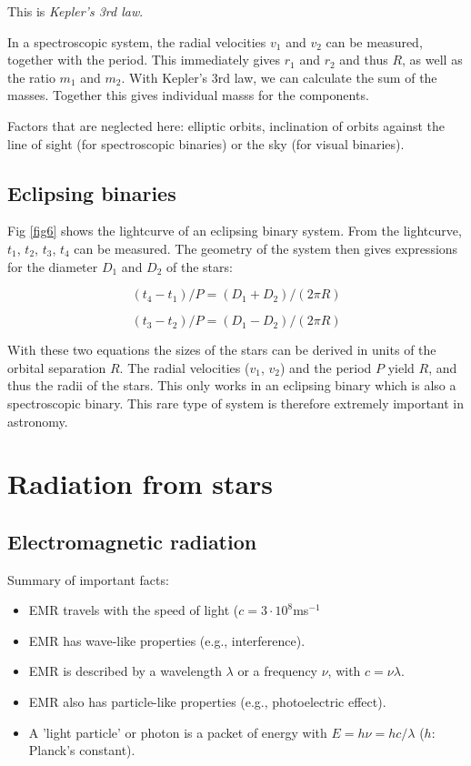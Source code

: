 This is \textit{Kepler's 3rd law}. 

In a spectroscopic system, the radial velocities $v_1$ and $v_2$ can be measured, together with the period. This immediately gives $r_1$ and $r_2$ and thus $R$, as well as the ratio $m_1$ and $m_2$. With Kepler's 3rd law, we can calculate the sum of the masses. Together this gives individual masss for the components. 

Factors that are neglected here: elliptic orbits, inclination of orbits against the line of sight (for spectroscopic binaries) or the sky (for visual binaries). 

\subsection{Eclipsing binaries}

Fig \ref{fig6} shows the lightcurve of an eclipsing binary system. From the lightcurve, $t_1$, $t_2$, $t_3$, $t_4$ can be measured. The geometry of the system then gives expressions for the diameter $D_1$ and $D_2$ of the stars:

\begin{equation}
(t_4 - t_1) / P = (D_1 + D_2) / (2 \pi R)
\label{eq13}
\end{equation}

\begin{equation}
(t_3 - t_2) / P = (D_1 - D_2) / (2 \pi R)
\label{e14}
\end{equation}

With these two equations the sizes of the stars can be derived in units of the orbital separation $R$. The radial velocities ($v_1$, $v_2$) and the period $P$ yield $R$, and thus the radii of the stars. This only works in an eclipsing binary which is also a spectroscopic binary. This rare type of system is therefore extremely important in astronomy.

\section{Radiation from stars}

\subsection{Electromagnetic radiation}

Summary of important facts:
\begin{itemize}
\item{EMR travels with the speed of light ($c = 3\cdot10^8$ms$^{-1}$}
\item{EMR has wave-like properties (e.g., interference).}
\item{EMR is described by a wavelength $\lambda$ or a frequency $\nu$,
with $c = \nu\lambda$.}
\item{EMR also has particle-like properties (e.g., photoelectric effect).}
\item{A 'light particle' or photon is a packet of energy with $E = h \nu = h c / \lambda$ ($h$: Planck's constant).}
\end{itemize}

